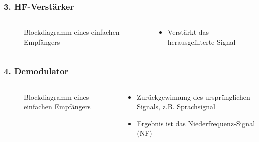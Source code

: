 \begin{frame}
\frametitle{3. HF-Verstärker}
\begin{columns}
    \begin{column}{0.48\textwidth}
    
\begin{figure}
    \caption{\scriptsize Blockdiagramm eines einfachen Empfängers}
    \label{aufbau_empfaenger_blockdiagramm}
\end{figure}


    \end{column}
   \begin{column}{0.48\textwidth}
       \begin{itemize}
  \item Verstärkt das herausgefilterte Signal
  \end{itemize}

   \end{column}
\end{columns}

\end{frame}

\begin{frame}
\frametitle{4. Demodulator}
\begin{columns}
    \begin{column}{0.48\textwidth}
    
\begin{figure}
    \caption{\scriptsize Blockdiagramm eines einfachen Empfängers}
    \label{aufbau_empfaenger_blockdiagramm}
\end{figure}


    \end{column}
   \begin{column}{0.48\textwidth}
       \begin{itemize}
  \item Zurückgewinnung des ursprünglichen Signals, z.B. Sprachsignal
  \item Ergebnis ist das Niederfrequenz-Signal (NF)
  \end{itemize}

   \end{column}
\end{columns}

\end{frame}


